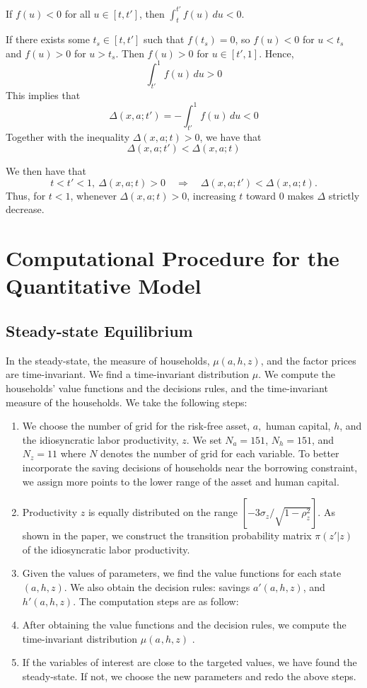 \documentclass[12pt,english]{article}
\numberwithin{equation}{section}
\begin{document}
{If $f(u)<0$ for all $u\in[t,t']$, then $\int_{t}^{t'} f(u)\,du<0$.

If there exists some $t_s\in[t,t']$ such that $f(t_s)=0$, so $f(u)<0$ for $u<t_s$ and $f(u)>0$ for $u>t_s$. Then $f(u)>0$ for $u\in[t',1]$. Hence, 
\[
\int_{t'}^{1} f(u)\,du>0
\]
This implies that
\[\Delta(x,a;t')=-\int_{t'}^{1} f(u)\,du<0\]
Together with the inequality $\Delta(x,a;t)>0$, we have that
\[\Delta(x,a;t')<\Delta(x,a;t)\]

We then have that 
\begin{equation}
t<t'<1,\ \Delta(x,a;t)>0
\quad\Longrightarrow\quad
\Delta(x,a;t')<\Delta(x,a;t).
\end{equation}
Thus, for $t<1$, whenever $\Delta(x,a;t)>0$, increasing $t$ toward $0$ makes $\Delta$ strictly decrease.



\section{Computational Procedure for the Quantitative Model}

\subsection{Steady-state Equilibrium}

In the steady-state, the measure of households, $\mu(a,h,z)$, and
the factor prices are time-invariant. We find a time-invariant distribution
$\mu$. We compute the households' value functions and the decisions
rules, and the time-invariant measure of the households. We take the
following steps:
\begin{enumerate}
\item We choose the number of grid for the risk-free asset, $a,$ human
capital, $h$, and the idiosyncratic labor productivity, $z$. We
set $N_{a}=151$, $N_{h}=151$, and $N_{z}=11$ where $N$ denotes
the number of grid for each variable. To better incorporate the saving
decisions of households near the borrowing constraint, we assign more
points to the lower range of the asset and human capital. 
\item Productivity $z$ is equally distributed on the range $[-3\sigma_{z}/\sqrt{1-\rho_{z}^{2}}]$.
As shown in the paper, we construct the transition probability matrix
$\pi(z'|z)$ of the idiosyncratic labor productivity.
\item Given the values of parameters, we find the value functions for each
state $(a,h,z).$ We also obtain the decision rules: savings $a'(a,h,z)$,
and $h'(a,h,z)$. The computation steps are as follow:
\item After obtaining the value functions and the decision rules, we compute
the time-invariant distribution $\mu(a_{},h,z)$ .
\item If the variables of interest are close to the targeted values, we
have found the steady-state. If not, we choose the new parameters
and redo the above steps.
\end{enumerate}

}
\end{document}
